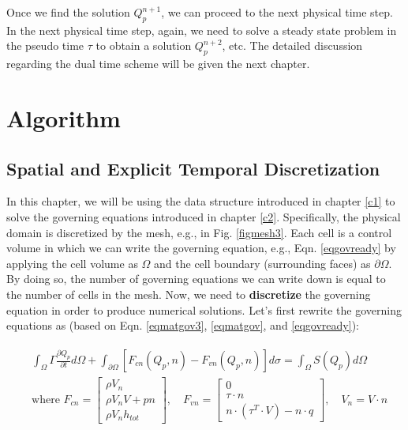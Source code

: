 \documentclass[12pt, letterpaper]{report}
\begin{document}
Once we find the solution $Q_p^{n+1}$, we can proceed to the next physical time step. In the next
physical time step, again, we need to solve a steady state problem in the pseudo time $\tau$ to
obtain a solution $Q_p^{n+2}$, etc. The detailed discussion regarding the dual time scheme will be
given the next chapter.\paraspace


\chapter{Algorithm}

\section{Spatial and Explicit Temporal Discretization}

In this chapter, we will be using the data structure introduced in chapter \ref{c1} to solve the
governing equations introduced in chapter \ref{c2}. Specifically, the physical domain is discretized
by the mesh, e.g., in Fig. \ref{figmesh3}. Each cell is a control volume in which we can write the
governing equation, e.g., Eqn. \ref{eqgovready} by applying the cell volume as $\Omega$ and the
cell boundary (surrounding faces) as $\partial\Omega$. By doing so, the number of governing
equations we can write down is equal to the number of cells in the mesh. Now, we need to {\bf
discretize} the governing equation in order to produce numerical solutions. Let's first rewrite the
governing equations as (based on Eqn. \ref{eqmatgov3}, \ref{eqmatgov}, and \ref{eqgovready}):

\begin{align}\label{eqgovalg}
\begin{split}
   &\int_{\Omega} \Gamma \frac{\partial Q_p}{\partial t} d\Omega + \int_{\partial\Omega}
   [F_{cn}(Q_p, n) - F_{vn}(Q_p, n)] d\sigma = \int_{\Omega} S(Q_p) d\Omega \\
   &\textrm{where  } F_{cn} = \begin{bmatrix}\rho V_n \\ \rho V_n V + pn \\ \rho V_n
      h_{tot}\end{bmatrix}, \quad F_{vn} = \begin{bmatrix}0 \\ \tau \cdot n \\ n \cdot (\tau^T \cdot
   V) - n \cdot q\end{bmatrix}, \quad V_n = V \cdot n
\end{split}
\end{align}
\end{document}
